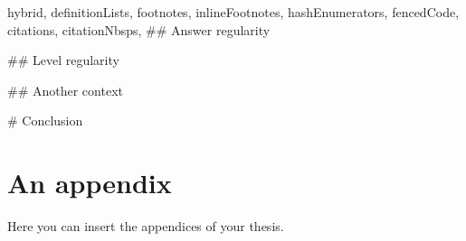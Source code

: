 \documentclass[
  digital, %
  table,   %
  nolof,     %
  nolot,     %
  nocover
]{fithesis3}
\begin{document}
\begin{markdown*}{%
  hybrid,
  definitionLists,
  footnotes,
  inlineFootnotes,
  hashEnumerators,
  fencedCode,
  citations,
  citationNbsps,
}
## Answer regularity




## Level regularity




## Another context



# Conclusion




\end{markdown*}

  \makeatletter\thesis@blocks@clear\makeatother
  \printindex

\appendix %
\chapter{An appendix}
Here you can insert the appendices of your thesis.
\end{document}
